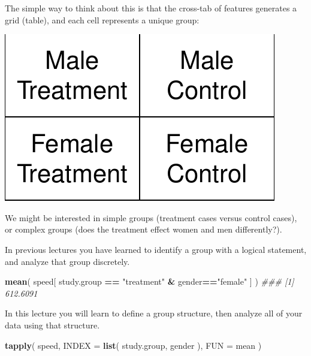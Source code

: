 \documentclass[]{book}
\newenvironment{Shaded}{\begin{snugshade}}{\end{snugshade}}
\newcommand{\CommentTok}[1]{\textcolor[rgb]{0.56,0.35,0.01}{\textit{#1}}}
\newcommand{\DataTypeTok}[1]{\textcolor[rgb]{0.13,0.29,0.53}{#1}}
\newcommand{\KeywordTok}[1]{\textcolor[rgb]{0.13,0.29,0.53}{\textbf{#1}}}
\newcommand{\NormalTok}[1]{#1}
\newcommand{\OperatorTok}[1]{\textcolor[rgb]{0.81,0.36,0.00}{\textbf{#1}}}
\newcommand{\StringTok}[1]{\textcolor[rgb]{0.31,0.60,0.02}{#1}}
\theoremstyle{definition}
\theoremstyle{definition}
\theoremstyle{definition}
\theoremstyle{remark}
\begin{document}
The simple way to think about this is that the cross-tab of features
generates a grid (table), and each cell represents a unique group:

\begin{center}\includegraphics[width=0.7\linewidth]{DS4PS-I_files/figure-latex/unnamed-chunk-151-1} \end{center}

We might be interested in simple groups (treatment cases versus control
cases), or complex groups (does the treatment effect women and men
differently?).

In previous lectures you have learned to identify a group with a logical
statement, and analyze that group discretely.

\begin{Shaded}
\begin{Highlighting}[]

\KeywordTok{mean}\NormalTok{( speed[ study.group }\OperatorTok{==}\StringTok{ "treatment"} \OperatorTok{&}\StringTok{ }\NormalTok{gender}\OperatorTok{==}\StringTok{"female"}\NormalTok{ ] )}
\CommentTok{### [1] 612.6091}
\end{Highlighting}
\end{Shaded}

In this lecture you will learn to define a group structure, then analyze
all of your data using that structure.

\begin{Shaded}
\begin{Highlighting}[]

\KeywordTok{tapply}\NormalTok{( speed, }\DataTypeTok{INDEX =} \KeywordTok{list}\NormalTok{( study.group, gender ), }\DataTypeTok{FUN =}\NormalTok{ mean )}
\end{Highlighting}
\end{Shaded}
\end{document}
